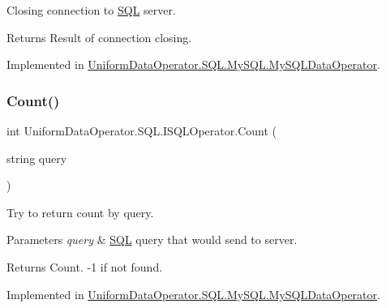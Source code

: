 Closing connection to \mbox{\hyperlink{namespace_uniform_data_operator_1_1_s_q_l}{S\+QL}} server. 

\begin{DoxyReturn}{Returns}
Result of connection closing.
\end{DoxyReturn}


Implemented in \mbox{\hyperlink{class_uniform_data_operator_1_1_s_q_l_1_1_my_s_q_l_1_1_my_s_q_l_data_operator_a91ede325ae734daa6a6fff90cab920bc}{Uniform\+Data\+Operator.\+S\+Q\+L.\+My\+S\+Q\+L.\+My\+S\+Q\+L\+Data\+Operator}}.

\mbox{\label{interface_uniform_data_operator_1_1_s_q_l_1_1_i_s_q_l_operator_a92feb21e03810b152f16f06d02d2034a}} 
\subsubsection{\texorpdfstring{Count()}{Count()}}
{\footnotesize\ttfamily int Uniform\+Data\+Operator.\+S\+Q\+L.\+I\+S\+Q\+L\+Operator.\+Count (\begin{DoxyParamCaption}\item[{string}]{query }\end{DoxyParamCaption})}



Try to return count by query. 


\begin{DoxyParams}{Parameters}
{\em query} & \mbox{\hyperlink{namespace_uniform_data_operator_1_1_s_q_l}{S\+QL}} query that would send to server.\\
\hline
\end{DoxyParams}
\begin{DoxyReturn}{Returns}
Count. -\/1 if not found.
\end{DoxyReturn}


Implemented in \mbox{\hyperlink{class_uniform_data_operator_1_1_s_q_l_1_1_my_s_q_l_1_1_my_s_q_l_data_operator_a05cba564076cc8506ab0272b29f96098}{Uniform\+Data\+Operator.\+S\+Q\+L.\+My\+S\+Q\+L.\+My\+S\+Q\+L\+Data\+Operator}}.

\mbox{\label{interface_uniform_data_operator_1_1_s_q_l_1_1_i_s_q_l_operator_a15108adeb878698e82104e374ac37ef2}} 
